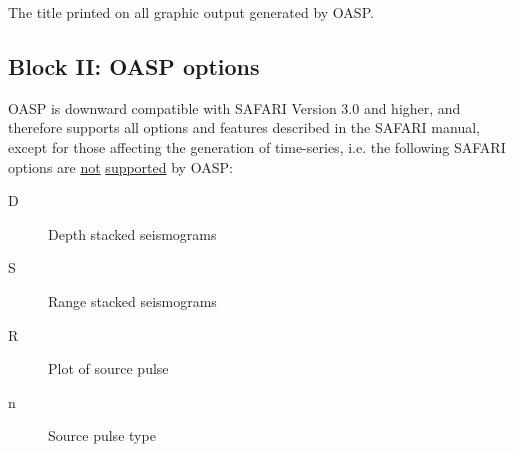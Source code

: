 The title printed on all graphic output generated by OASP.

\subsection{Block II: OASP options}

    OASP is downward compatible with SAFARI  Version 
3.0  and higher, and therefore supports all options and  features 
described in the SAFARI manual, except for those affecting the
generation of time-series, i.e. the following SAFARI options are 
\underline{not}
\underline{supported} by OASP:
\begin{description}
    \item[D] Depth stacked seismograms
    \item[S] Range stacked seismograms
    \item[R] Plot of source pulse
    \item[n] Source pulse type
\end{description}

